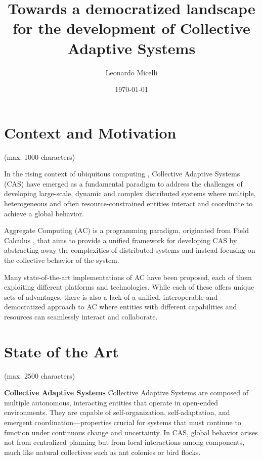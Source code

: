 \documentclass[12pt]{article}
\begin{document}
\title{Towards a democratized landscape for the development of Collective Adaptive Systems}
\author{Leonardo Micelli}
\date{\today}
\maketitle

\noindent


\newpage
\setcounter{tocdepth}{2}
\tableofcontents

\setlength{\parindent}{0em}
\setlength{\parskip}{1em}


\newpage
\section{Context and Motivation}
(max. 1000 characters)

In the rising context of ubiquitous computing \cite{weiser1991computer},
Collective Adaptive Systems (CAS) have emerged as a fundamental paradigm to
address the challenges of developing large-scale, dynamic and complex distributed
systems where multiple, heterogeneous and often resource-constrained entities
interact and coordinate to achieve a global behavior.

Aggregate Computing (AC) is a programming paradigm, originated from Field Calculus \cite{viroli2013calculus},
that aims to provide a unified framework for developing CAS by abstracting away the complexities
of distributed systems and instead focusing on the collective behavior of the system.

Many state-of-the-art implementations of AC have been proposed, each of them exploiting different platforms
and technologies. While each of these offers unique sets of advantages, there is also a lack of a unified, interoperable 
and democratized approach to AC where entities with different capabilities and resources can seamlessly interact and collaborate.

\newpage
\section{State of the Art}
(max. 2500 characters)

\textbf{Collective Adaptive Systems} Collective Adaptive Systems are composed of multiple autonomous, interacting entities that operate in open-ended environments. 
They are capable of self-organization, self-adaptation, and emergent coordination—properties crucial for systems that must continue to function under continuous change and uncertainty.
In CAS, global behavior arises not from centralized planning but from local interactions among components, much like natural collectives such as ant colonies or bird flocks.
\end{document}

